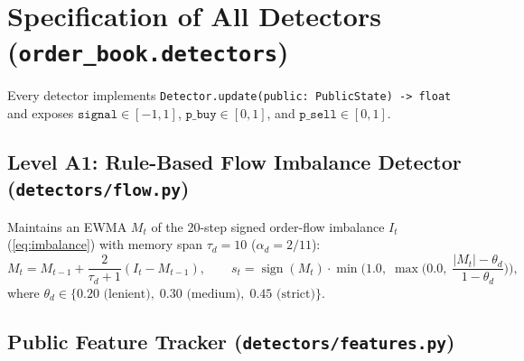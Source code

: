 \documentclass[11pt,a4paper]{article}
\newcommand{\code}[1]{\texttt{#1}}
\newcommand{\sign}{\operatorname{sign}}
\begin{document}
\section[Specification of All Detectors]{Specification of All Detectors (\code{order\_book.detectors})}
\label{sec:detectors}

Every detector implements \code{Detector.update(public: PublicState) -> float} and exposes
$\code{signal} \in [-1,1]$, $\code{p\_buy} \in [0,1]$, and $\code{p\_sell} \in [0,1]$.

\subsection{Level A1: Rule-Based Flow Imbalance Detector (\code{detectors/flow.py})}

Maintains an EWMA $M_t$ of the 20-step signed order-flow imbalance $I_t$ (\ref{eq:imbalance}) with memory
span $\tau_d = 10$ ($\alpha_d = 2/11$):
\begin{equation}
  M_t = M_{t-1} + \frac{2}{\tau_d + 1}(I_t - M_{t-1}), \qquad
  s_t = \sign(M_t)\cdot\min\!\Big(1.0,\; \max\!\Big(0.0,\; \frac{|M_t| - \theta_d}{1 - \theta_d}\Big)\Big),
\end{equation}
where $\theta_d \in \{0.20\text{ (lenient)},\; 0.30\text{ (medium)},\; 0.45\text{ (strict)}\}$.

\subsection{Public Feature Tracker (\code{detectors/features.py})}
\end{document}
